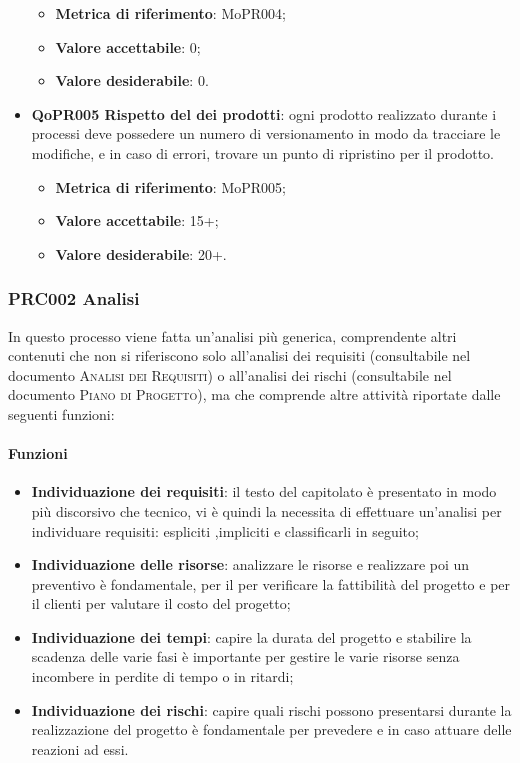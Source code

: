\documentclass[../piano-di-qualifica.tex]{subfiles}
\begin{document}
\begin{itemize}
        \begin{itemize}
            \item \textbf{Metrica di riferimento}: MoPR004;
            \item \textbf{Valore accettabile}: 0; %
            \item \textbf{Valore desiderabile}: 0.
        \end{itemize}
    \item \textbf{QoPR005 Rispetto del  dei prodotti}: ogni prodotto realizzato durante i processi deve possedere un numero di versionamento in modo da tracciare le modifiche, e in caso di errori, trovare un punto di ripristino per il prodotto.
        \begin{itemize}
            \item \textbf{Metrica di riferimento}: MoPR005;
            \item \textbf{Valore accettabile}: 15+; %
            \item \textbf{Valore desiderabile}: 20+.
        \end{itemize}
\end{itemize}

\subsubsection{PRC002 Analisi}
\label{sub:analisi}
In questo processo viene fatta un'analisi più generica, comprendente altri contenuti che non si riferiscono solo all'analisi dei requisiti (consultabile nel documento \textsc{Analisi dei Requisiti}) o all'analisi dei rischi (consultabile nel documento \textsc{Piano di Progetto}), ma che comprende altre attività riportate dalle seguenti funzioni:

\paragraph{Funzioni}
\label{sub:funzioni_2}
\begin{itemize}
    \item \textbf{Individuazione dei requisiti}: il testo del capitolato è presentato in modo più discorsivo che tecnico, vi è quindi la necessita di effettuare un'analisi per individuare requisiti: espliciti ,impliciti e classificarli in seguito;
    \item \textbf{Individuazione delle risorse}: analizzare le risorse e realizzare poi un preventivo è fondamentale, per il  per verificare la fattibilità del progetto e per il clienti per valutare il costo del progetto;
    \item \textbf{Individuazione dei tempi}: capire la durata del progetto e stabilire la scadenza delle varie fasi è importante per gestire le varie risorse senza incombere in perdite di tempo o in ritardi;
    \item \textbf{Individuazione dei rischi}: capire quali rischi possono presentarsi durante la realizzazione del progetto è fondamentale per prevedere e in caso attuare delle reazioni ad essi.
\end{itemize}
\end{document}

